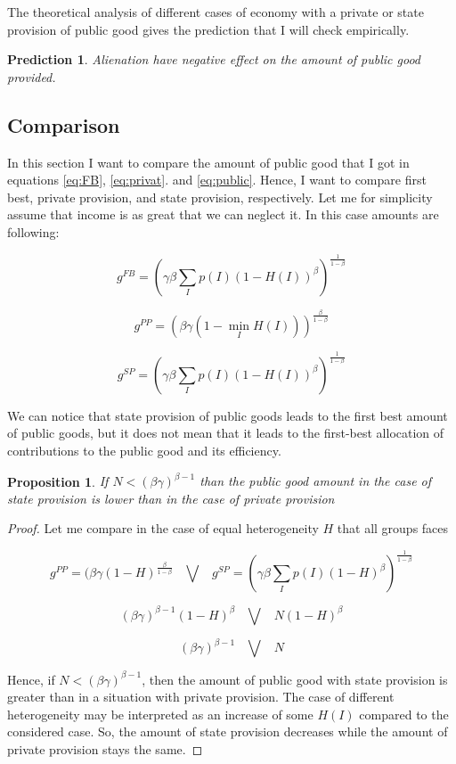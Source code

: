 \documentclass[12pt]{article}
\newtheorem{proposition}{Proposition}
\newtheorem{prediction}{Prediction}
\begin{document}
The theoretical analysis of different cases of economy with a private or state provision of public good gives the prediction that I will check empirically.

\begin{prediction}
    Alienation have negative effect on the amount of public good provided.
\end{prediction}

\subsection{Comparison}

In this section I want to compare the amount of public good that I got in equations \ref{eq:FB}, \ref{eq:privat}. and \ref{eq:public}. Hence, I want to compare first best, private provision, and state provision, respectively. Let me for simplicity assume that income is as great that we can neglect it. In this case amounts are following:

\[  g^{FB} = \left( \gamma\beta \sum_{I} p(I) (1-H(I))^{\beta} \right) ^\frac{1}{1 - \beta }  \]

\[ g^{PP} =  (\beta\gamma  ( 1 - \min_{I} H(I)))^\frac{\beta}{1 -\beta} \]

\[  g^{SP} = \left( \gamma  \beta\sum_{I} p(I) (1 - H(I))^\beta \right)^\frac{1}{1 - \beta}\]

We can notice that state provision of public goods leads to the first best amount of public goods, but it does not mean that it leads to the first-best allocation of contributions to the public good and its efficiency.

\begin{proposition}
If $N < (\beta\gamma)^{\beta-1}$ than the public good amount in the case of state provision is lower than in the case of private provision
\end{proposition}

\begin{proof}
    Let me compare in the case of equal heterogeneity $H$ that all groups faces

    \[ g^{PP} =  (\beta\gamma  ( 1 - H)^\frac{\beta}{1 -\beta}\;\;\; \bigvee \;\;\; g^{SP} = \left( \gamma  \beta\sum_{I} p(I) (1 - H)^\beta \right)^\frac{1}{1 - \beta} \]

    \[  (\beta\gamma)^{\beta-1}  (1 - H)^\beta \;\;\; \bigvee \;\;\;  N (1 - H)^\beta \]

    \[  (\beta\gamma)^{\beta-1} \;\;\; \bigvee \;\;\;  N \]

    Hence, if $N < (\beta\gamma)^{\beta-1}$, then the amount of public good with state provision is greater than in a situation with private provision. The case of different heterogeneity may be interpreted as an increase of some $H(I)$ compared to the considered case. So, the amount of state provision decreases while the amount of private provision stays the same.
\end{proof}
\end{document}
